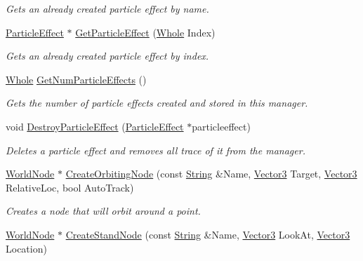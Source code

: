 \begin{DoxyCompactItemize}
\begin{DoxyCompactList}\small\item\em Gets an already created particle effect by name. \item\end{DoxyCompactList}\item 
\hyperlink{classphys_1_1ParticleEffect}{ParticleEffect} $\ast$ \hyperlink{classphys_1_1SceneManager_ae8508d38b670e4d2d16ee1f5a95dc29b}{GetParticleEffect} (\hyperlink{namespacephys_a460f6bc24c8dd347b05e0366ae34f34a}{Whole} Index)
\begin{DoxyCompactList}\small\item\em Gets an already created particle effect by index. \item\end{DoxyCompactList}\item 
\hyperlink{namespacephys_a460f6bc24c8dd347b05e0366ae34f34a}{Whole} \hyperlink{classphys_1_1SceneManager_a1d3c320cf0578c2e09dc488f95ed88e2}{GetNumParticleEffects} ()
\begin{DoxyCompactList}\small\item\em Gets the number of particle effects created and stored in this manager. \item\end{DoxyCompactList}\item 
void \hyperlink{classphys_1_1SceneManager_addce8f82a6758db345568dbd4a88f5b9}{DestroyParticleEffect} (\hyperlink{classphys_1_1ParticleEffect}{ParticleEffect} $\ast$particleeffect)
\begin{DoxyCompactList}\small\item\em Deletes a particle effect and removes all trace of it from the manager. \item\end{DoxyCompactList}\item 
\hyperlink{classphys_1_1WorldNode}{WorldNode} $\ast$ \hyperlink{classphys_1_1SceneManager_ad86be1c140e04c7579af80c1e33150fd}{CreateOrbitingNode} (const \hyperlink{namespacephys_aa03900411993de7fbfec4789bc1d392e}{String} \&Name, \hyperlink{classphys_1_1Vector3}{Vector3} Target, \hyperlink{classphys_1_1Vector3}{Vector3} RelativeLoc, bool AutoTrack)
\begin{DoxyCompactList}\small\item\em Creates a node that will orbit around a point. \item\end{DoxyCompactList}\item 
\hyperlink{classphys_1_1WorldNode}{WorldNode} $\ast$ \hyperlink{classphys_1_1SceneManager_afb93b25cdd669066481e7bc81c33674a}{CreateStandNode} (const \hyperlink{namespacephys_aa03900411993de7fbfec4789bc1d392e}{String} \&Name, \hyperlink{classphys_1_1Vector3}{Vector3} LookAt, \hyperlink{classphys_1_1Vector3}{Vector3} Location)

\end{DoxyCompactItemize}
